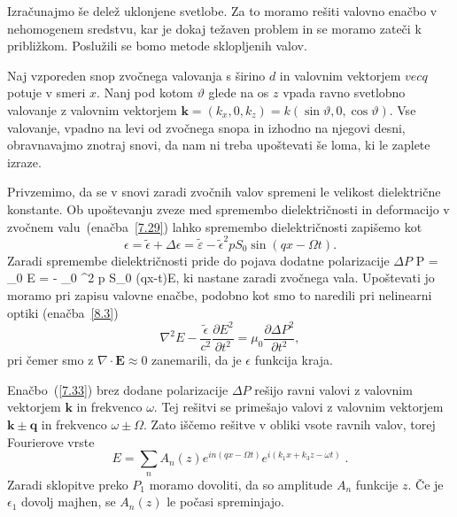 Izračunajmo še delež uklonjene svetlobe. Za to moramo rešiti 
valovno enačbo v nehomogenem sredstvu, kar je dokaj težaven problem
in se moramo zateči k približkom. Poslužili se bomo metode sklopljenih valov. 

Naj vzporeden snop zvočnega valovanja s širino $d$ in valovnim vektorjem $vec{q}$ potuje v smeri $x$.
Nanj pod kotom $\vartheta$ glede na os $z$ vpada ravno svetlobno valovanje z valovnim vektorjem 
$\mathbf{k}=(k_{x},0,k_{z})= k(\sin\vartheta,0,\cos\vartheta)$.
Vse valovanje, vpadno na levi od zvočnega snopa in izhodno na njegovi desni,
obravnavajmo znotraj snovi, da nam ni treba upoštevati še loma, ki
le zaplete izraze. 

Privzemimo, da se v snovi zaradi zvočnih valov spremeni le velikost
dielektrične konstante. Ob upoštevanju zveze med spremembo dielektričnosti in deformacijo
v zvočnem valu~(enačba~\ref{7.29}) lahko spremembo dielektričnosti
zapišemo kot  
\begin{equation}
\epsilon=\tilde{\epsilon}+\Delta\epsilon = 
\tilde{\varepsilon} -\tilde{\epsilon}^{2}pS_{0}\sin(qx-\Omega t).
\label{7.33}
\end{equation}
Zaradi spremembe dielektričnosti pride do pojava
dodatne polarizacije $\Delta P$
\beq
\Delta P = \varepsilon_0 \Delta \varepsilon E = - \varepsilon_0 \tilde{\varepsilon}^2 p S_0 \sin(qx-\Omega t)E,
\eeq
ki nastane zaradi zvočnega vala. Upoštevati jo moramo pri zapisu valovne enačbe, 
podobno kot smo to naredili pri nelinearni optiki (enačba~\ref{8.3})
\begin{equation}
\nabla^{2}E-\frac{\tilde{\epsilon}}{c^{2}}{\frac{\partial E^{2}}
{\partial t^{2}}}=\mu_{0}{\frac{\partial \Delta P^{2}}{\partial t^{2}}},
\label{7.33}
\end{equation}
pri čemer smo z $\nabla\cdot\mathbf{E}\approx 0$ zanemarili, da je
$\epsilon$ funkcija kraja. 

Enačbo~(\ref{7.33}) brez dodane polarizacije $\Delta P$ rešijo ravni valovi 
z valovnim vektorjem $\mathbf{k}$ in frekvenco $\omega$. Tej rešitvi se 
primešajo valovi z valovnim vektorjem $\mathbf{k}\pm\mathbf{q}$
in frekvenco $\omega\pm\Omega$. Zato iščemo rešitve v obliki vsote
ravnih valov, torej Fourierove vrste
\begin{equation}
E=\sum_{n}A_{n}(z)e^{in(qx-\Omega t)}e^{i(k_{1}x+k_{3}z-\omega t)}\;.\label{7.34}
\end{equation}
 Zaradi sklopitve preko $P_{1}$ moramo dovoliti, da so amplitude
$A_{n}$ funkcije $z$. Če je $\epsilon_{1}$ dovolj majhen, se $A_{n}(z)$
le počasi spreminjajo.

